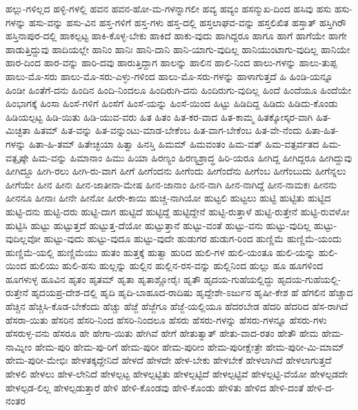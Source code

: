{ಹಲ್ಲು-ಗಳಿಲ್ಲದ
ಹಳ್ಳಿ-ಗಳಲ್ಲಿ
ಹವನ
ಹವನ-ಹೋ-ಮ-ಗಳನ್ನಾಗಲೀ
ಹವ್ಯ
ಹವ್ಯಂ
ಹಸನ್ಮುಖ-ದಿಂದ
ಹಸಿವು
ಹಸು
ಹಸು-ಗಳನ್ನು
ಹಸು-ವನ್ನು
ಹಸು-ವಿನ
ಹಸ್ತ-ಗಳಿಗೆ
ಹಸ್ತ-ಗಳು
ಹಸ್ತ-ದಲ್ಲಿ
ಹಸ್ತಲಾಘವ-ವನ್ನು
ಹಸ್ತಲಿಖಿತ
ಹಸ್ತಾತ್
ಹಸ್ತಿಗಿರೌ
ಹಸ್ತಿನಾಪುರ-ದಲ್ಲಿ
ಹಾಕಲ್ಪಟ್ಟ
ಹಾಕಿ-ಕೊಳ್ಳ-ಬೇಕು
ಹಾಕಿದೆ
ಹಾಕು-ವುದು
ಹಾಗಿದ್ದರೂ
ಹಾಗೂ
ಹಾಗೆ
ಹಾಗೆಯೇ
ಹಾಗೇ
ಹಾಡುತ್ತಿದ್ದುವು
ಹಾದಿಯಲ್ಲೇ
ಹಾನಿಂ
ಹಾನಿಃ
ಹಾನಿ-ದಾನಿ
ಹಾನಿ-ಯಾಗು-ವುದಿಲ್ಲ
ಹಾನಿಯುಂಟಾಗು-ವುದಿಲ್ಲ
ಹಾನಿಯೇ
ಹಾರ-ದಿಂದ
ಹಾರ-ವನ್ನು
ಹಾರಿ-ದವು
ಹಾರುತ್ತಿದ್ದಾಗ
ಹಾಲನ್ನು
ಹಾಲಿನ
ಹಾಲಿ-ನಿಂದ
ಹಾಲು-ಗಳನ್ನು
ಹಾಲು-ತುಪ್ಪ
ಹಾಲು-ಮೊ-ಸರು
ಹಾಲು-ಮೊ-ಸರು-ಎಳ್ಳು-ಗಳಿಂದ
ಹಾಲು-ಮೊ-ಸರು-ಗಳನ್ನು
ಹಾಳಾಗುತ್ತದೆ
ಹಿ
ಹಿಂಡಿ-ಯನ್ನೂ
ಹಿಂಡೀ
ಹಿಂತೆಗೆ-ದನು
ಹಿಂದಿನ
ಹಿಂದಿ-ನಿಂದಲೂ
ಹಿಂದಿರುಗಿ-ದನು
ಹಿಂದಿರುಗು-ವುದಿಲ್ಲ
ಹಿಂದೆ
ಹಿಂದೆಯೂ
ಹಿಂದೆಯೇ
ಹಿಂಭಾಗಕ್ಕೆ
ಹಿಂಸಾ
ಹಿಂಸೆ-ಗಳಿಗೆ
ಹಿಂಸೆಗೆ
ಹಿಂಸೆ-ಯನ್ನು
ಹಿಂಸೆ-ಯಿಂದ
ಹಿಟ್ಟು
ಹಿಡಿದಿದ್ದ
ಹಿಡಿದು
ಹಿಡಿದು-ಕೊಂಡು
ಹಿಡಿಯಲ್ಪಟ್ಟ
ಹಿಡಿ-ಯಿತು
ಹಿಡಿ-ಯುವ-ವರು
ಹಿತ
ಹಿತಂ
ಹಿತ-ಕರ-ವಾದ
ಹಿತ-ಕಾಮ್ಮ
ಹಿತಕ್ಕೋಸ್ಕರ-ವಾಗಿ
ಹಿತ-ಮಿಚ್ಛತಾ
ಹಿತಮ್
ಹಿತ-ವನ್ನು
ಹಿತ-ವನ್ನುಂಟು-ಮಾಡ-ಬೇಕೆಂಬ
ಹಿತ-ವಾಗ-ಬೇಕೆಂಬ
ಹಿತ-ವೇ-ನೆಂದು
ಹಿತಾ-ಹಿತ-ಗಳನ್ನು
ಹಿತಾ-ಹಿ-ತಮ್
ಹಿತೇಚ್ಛಯಾ
ಹಿತ್ವಾ
ಹಿನಸ್ತಿ
ಹಿಮಮ್
ಹಿಮವಂತಂ
ಹಿಮ-ವತ್
ಹಿಮ-ವತ್ಪರ್ವತದ
ಹಿಮ-ವತ್ಪೃಷ್ಠೇ
ಹಿಮ-ವನ್ನು
ಹಿಮಾನಾಂ
ಹಿಮು
ಹಿಯಾ
ಹಿರಣ್ಯಂ
ಹಿರಣ್ಯಶ್ರಾದ್ಧ
ಹಿರಿ-ಯರೂ
ಹೀಗಿದ್ದ
ಹೀಗಿದ್ದರೂ
ಹೀಗಿದ್ದುವು
ಹೀಗಿದ್ದೂ
ಹೀಗಿ-ರಲು
ಹೀಗಿ-ರು-ವಾಗ
ಹೀಗೆ
ಹೀಗೆಂದನು
ಹೀಗೆಂದು
ಹೀಗೆಂದೆನು
ಹೀಗೆಂಬ
ಹೀಗೆಂಬುದು
ಹೀಗೆನ್ನಲು
ಹೀಗೆಯೇ
ಹೀನ
ಹೀನಃ
ಹೀನ-ಜಾತೀನಾ-ಮೇಷ
ಹೀನ-ಜಾನಾಂ
ಹೀನ-ನಾಗಿ
ಹೀನ-ನಾಗಿದ್ದೆ
ಹೀನ-ನಾಮಕಃ
ಹೀನನು
ಹೀನನೂ
ಹೀನಾಃ
ಹೀನೇ
ಹೀನೋ
ಹೀರೇ-ಕಾಯಿ
ಹುಚ್ಚ-ನಾಗಿಯೋ
ಹುಟ್ಟಲಿ
ಹುಟ್ಟಲು
ಹುಟ್ಟಿ
ಹುಟ್ಟಿತು
ಹುಟ್ಟಿದ
ಹುಟ್ಟಿ-ದನು
ಹುಟ್ಟಿ-ದರು
ಹುಟ್ಟಿ-ದಾಗ
ಹುಟ್ಟಿದೆ
ಹುಟ್ಟಿದ್ದೆ
ಹುಟ್ಟಿದ್ದೇನೆ
ಹುಟ್ಟಿ-ರುತ್ತಾಳೆ
ಹುಟ್ಟಿ-ರುತ್ತೇನೆ
ಹುಟ್ಟಿ-ರುವಳೋ
ಹುಟ್ಟಿಸಿ
ಹುಟ್ಟು
ಹುಟ್ಟುತ್ತದೆ
ಹುಟ್ಟುತ್ತ-ದೆಯೋ
ಹುಟ್ಟುತ್ತಾನೆ
ಹುಟ್ಟು-ವಂತೆ
ಹುಟ್ಟು-ವನು
ಹುಟ್ಟು-ವುದಿಲ್ಲ
ಹುಟ್ಟು-ವುದಿಲ್ಲವೋ
ಹುಟ್ಟು-ವುದು
ಹುಟ್ಟು-ವುದೂ
ಹುಟ್ಟು-ವುದೇ
ಹುಡುಗರ
ಹುಡುಗ-ರಿಂದ
ಹುಣ್ಣಿಮೆ
ಹುಣ್ಣಿಮೆ-ಯಂದು
ಹುಣ್ಣಿಮೆ-ಯಲ್ಲಿ
ಹುಣ್ಣಿಮೆಯು
ಹುತಂ
ಹುತ್ತಕ್ಕೆ
ಹುತ್ವಾ
ಹುರಿದ
ಹುಲಿ-ಗಳ
ಹುಲಿ-ಯಂತೂ
ಹುಲಿ-ಯನ್ನು
ಹುಲಿ-ಯಿಂದ
ಹುಲಿಯು
ಹುಲಿ-ಹಸು
ಹುಲ್ಲನ್ನು
ಹುಲ್ಲಿನ
ಹುಲ್ಲಿನ-ರಸ-ವನ್ನು
ಹುಲ್ಲಿನಿಂದ
ಹುಲ್ಲು
ಹೂ
ಹೂಗಳಿಂದ
ಹೂಗಳುಳ್ಳ
ಹೂವಿನ
ಹೃತಂ
ಹೃತಮ್
ಹೃತಾ
ಹೃತಾಶ್ಣೋರೈಃ
ಹೃತೌ
ಹೃದಯ-ಗುಹೆಯಲ್ಲಿದ್ದು
ಹೃದಯ-ಗುಹೆಯಲ್ಲಿ-ರುತ್ತೇನೆ
ಹೃದಯಪ್ರ-ದೇಶ-ದಲ್ಲಿ
ಹೃದಿ
ಹೃದಿ-ಬಾಹೂದ-ರಾದಿಷು
ಹೃದ್ದೇಶೇ-ಽರ್ಜುನ
ಹೃಷೀ-ಕೇಶ
ಹೆ
ಹೆಗಲಿನ
ಹೆಚ್ಚಾದ
ಹೆಚ್ಚಿನ
ಹೆಚ್ಚಿಸಿ-ಕೊಡ-ಬೇಕೆಂದು
ಹೆಚ್ಚು
ಹೆಜ್ಜೆ
ಹೆಜ್ಜೆಗೂ
ಹೆಜ್ಜೆ-ಯಲ್ಲಿಯೂ
ಹೆದರಬೇಡ
ಹೆದರಿ
ಹೆದರಿದ
ಹೆಸ-ರಾಗಿದೆ
ಹೆಸರಾ-ಯಿತು
ಹೆಸರಿನ
ಹೆಸರಿ-ನಿಂದ
ಹೆಸರಿ-ನಿಂದಲೂ
ಹೆಸರು
ಹೆಸರು-ಗಳನ್ನು
ಹೆಸರು-ಗಳನ್ನೂ
ಹೆಸರು-ಗಳು
ಹೆಸರುಳ್ಳ-ವನು
ಹೆಸರೂ
ಹೇ
ಹೇಗಾ-ಯಿತು
ಹೇಗಿವೆ
ಹೇಗೆ
ಹೇತುತ್ವಾತ್
ಹೇತು-ವಾದ-ರತಂ
ಹೇತೌ
ಹೇಮ
ಹೇಮ-ನಾಮ್ನೀಂ
ಹೇಮ-ಪುರಿ
ಹೇಮ-ಪು-ರಿಗೆ
ಹೇಮ-ಪುರೀ
ಹೇಮ-ಪುರೀಂ
ಹೇಮ-ಪುರೀಕ್ಷೇತ್ರೇ
ಹೇಮ-ಪುರೀ-ಮಿ-ಮಾಮ್
ಹೇಮ-ಪುರೀ-ಮೇಭಿಃ
ಹೇಳತಕ್ಕದ್ದೇನಿದೆ
ಹೇಳದೆ
ಹೇಳದೇ
ಹೇಳ-ಬೇಕು
ಹೇಳಬೇಕೆ
ಹೇಳಲಾಗಿದೆ
ಹೇಳಲಾಗುತ್ತದೆ
ಹೇಳಲಿ
ಹೇಳಲು
ಹೇಳ-ಲೇನಿದೆ
ಹೇಳಲ್ಪಟ್ಟ
ಹೇಳಲ್ಪಟ್ಟಿತು
ಹೇಳಲ್ಪಟ್ಟಿದೆ
ಹೇಳಲ್ಪಟ್ಟಿವೆ
ಹೇಳಲ್ಪಟ್ಟಿ-ವೆಯೋ
ಹೇಳಲ್ಪಡದೇ
ಹೇಳಲ್ಪಡ-ಲಿಲ್ಲ
ಹೇಳಲ್ಪಡುತ್ತಾರೆ
ಹೇಳಿ
ಹೇಳಿ-ಕೊಂಡವು
ಹೇಳಿ-ಕೊಂಡು
ಹೇಳಿತು
ಹೇಳಿದ
ಹೇಳಿ-ದಂತೆ
ಹೇಳಿ-ದ-ನಂತರ
}
